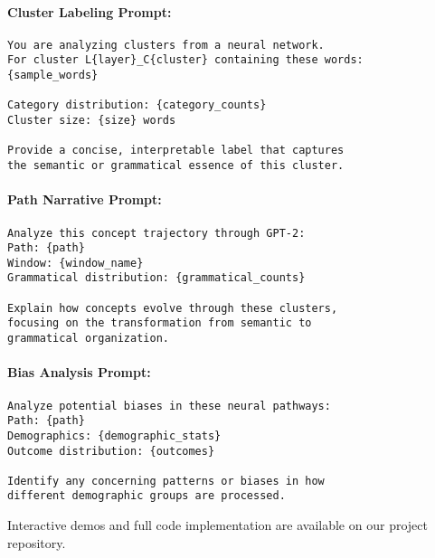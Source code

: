 \paragraph{Cluster Labeling Prompt:}
\begin{verbatim}
You are analyzing clusters from a neural network. 
For cluster L{layer}_C{cluster} containing these words:
{sample_words}

Category distribution: {category_counts}
Cluster size: {size} words

Provide a concise, interpretable label that captures 
the semantic or grammatical essence of this cluster.
\end{verbatim}

\paragraph{Path Narrative Prompt:}
\begin{verbatim}
Analyze this concept trajectory through GPT-2:
Path: {path}
Window: {window_name}
Grammatical distribution: {grammatical_counts}

Explain how concepts evolve through these clusters,
focusing on the transformation from semantic to 
grammatical organization.
\end{verbatim}

\paragraph{Bias Analysis Prompt:}
\begin{verbatim}
Analyze potential biases in these neural pathways:
Path: {path}
Demographics: {demographic_stats}
Outcome distribution: {outcomes}

Identify any concerning patterns or biases in how
different demographic groups are processed.
\end{verbatim}

Interactive demos and full code implementation are available on our project repository.